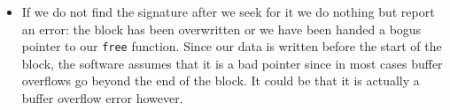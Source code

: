 \documentclass[12pt,a4paper,openany]{memoir} %
\begin{document}
{{\begin{itemize}
\item
If we do not find the signature after we seek for it we do nothing but report an error:
the block has been overwritten or we have been handed a bogus pointer to our \verb,free,
function. Since our data is written before the start of the block, the software assumes
that it is a bad pointer since in most cases buffer overflows go beyond the end
of the block. It could be that it is actually a buffer overflow error however.
\end{itemize}
}}
\end{document}
